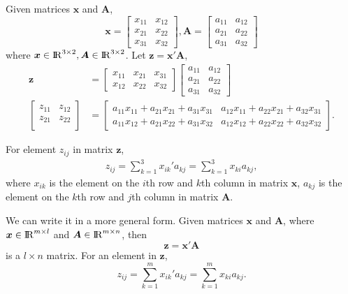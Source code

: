 \documentclass[10pt]{article}
\begin{document}
Given matrices $ \bm{x} $ and $ \bm{A} $,
\begin{equation*}
\bm{x} = 
\begin{bmatrix}
		x_{11} & x_{12}\\
		x_{21} & x_{22}\\
		x_{31} & x_{32}
\end{bmatrix}
,
\bm{A} = 
\begin{bmatrix}
		a_{11} & a_{12}\\
		a_{21} & a_{22}\\
		a_{31} & a_{32}
\end{bmatrix}
\end{equation*}
where $ \bm{x} \in {\rm I\!{R}}^{3  \times 2}, \bm{A} \in {\rm I\!{R}}^{3  \times 2} $.
Let $ \bm{z} = \bm{x}' \bm{A} $,
\begin{align*}
\bm{z} &= 
\begin{bmatrix}
		x_{11} & x_{21} & x_{31}\\
		x_{12} & x_{22} & x_{32}
\end{bmatrix}
\begin{bmatrix}
		a_{11} & a_{12}\\
		a_{21} & a_{22}\\
		a_{31} & a_{32}
\end{bmatrix}
\\
\begin{bmatrix}
		z_{11} & z_{12}\\
		z_{21} & z_{22}\\
\end{bmatrix}
&= 
\begin{bmatrix}
a_{11}x_{11} + a_{21}x_{21} + a_{31}x_{31} & a_{12}x_{11} + a_{22}x_{21} + a_{32}x_{31}\\
a_{11}x_{12} + a_{21}x_{22} + a_{31}x_{32} & a_{12}x_{12} + a_{22}x_{22} + a_{32}x_{32}
\end{bmatrix}
.
\end{align*}

For element $ z_{ij} $ in matrix $ \bm{z} $,
\begin{align*}
z_{ij} = \sum\limits_{k = 1} ^ 3 x_{ik}' a_{kj} = \sum\limits_{k = 1} ^3 x_{ki}a_{kj},
\end{align*}
where $ x_{ik} $ is the element on the $ i $th row and $ k $th column in matrix 
$ \bm{x} $, $ a_{kj} $ is the element on the $ k $th row and $ j $th column in matrix
$ \bm{A} $.

We can write it in a more general form. Given matrices $ \bm{x} $ and $ \bm{A} $,
where $ \bm{x} \in {\rm I\!{R}}^{m  \times  l} $ and
$ \bm{A} \in {\rm I\!{R}}^{m  \times n} $, then
\begin{equation*}
		\bm{z} = \bm{x}'\bm{A}
\end{equation*}
is a $ l  \times n $ matrix.
For an element in $ \bm{z} $,
\begin{equation*}
z_{ij} = \sum\limits_{k = 1} ^	m x_{ik}'a_{kj} = \sum\limits_{k = 1} ^m	x_{ki}a_{kj}.
\end{equation*}
\end{document}
